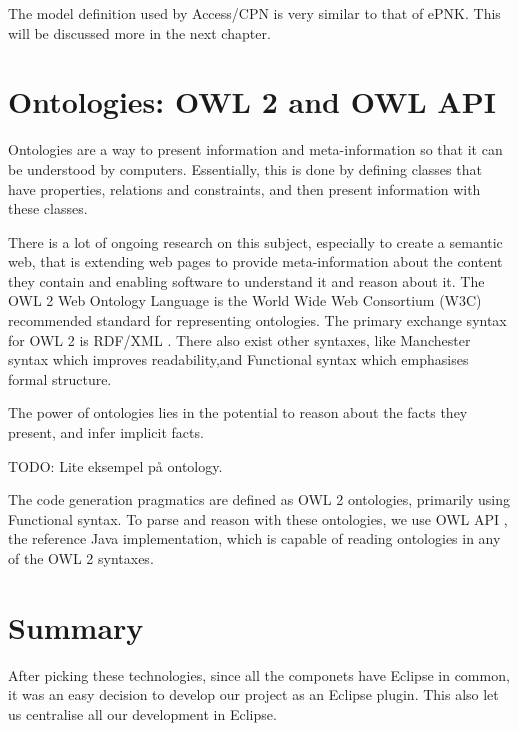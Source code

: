 The model definition used by Access/CPN is very similar to that of ePNK. This
will be discussed more in the next chapter.

\section{Ontologies: OWL 2 and OWL API}\label{sec:ontologies}

Ontologies are a way to present information and meta-information so that it can
be understood by computers. Essentially, this is done by defining classes that
have properties, relations and constraints, and then present
information with these classes.

There is a lot of ongoing research on this subject, especially to create a
semantic web, that is extending web pages to provide meta-information about the
content they contain and enabling software to understand it and reason about it.
The OWL 2 Web Ontology Language \cite{owl2-overview} is the World Wide Web
Consortium (W3C) recommended standard for representing ontologies. The primary
exchange syntax for OWL 2 is RDF/XML \cite{rdf-xml}. There also exist
other syntaxes, like Manchester syntax which improves readability,and
Functional syntax which emphasises formal structure.

The power of ontologies lies in the potential to reason about the facts they
present, and infer implicit facts. 

TODO: Lite eksempel på ontology.

The code generation pragmatics are defined as OWL 2 ontologies, primarily using
Functional syntax. To parse and reason with these ontologies, we use OWL API
\cite{owlapi}, the reference Java implementation, which is capable of reading
ontologies in any of the OWL 2 syntaxes.

\section{Summary}
After picking these technologies, since all the componets have Eclipse in
common, it was an easy decision to develop our project as an Eclipse plugin.
This also let us centralise all our development in Eclipse.
